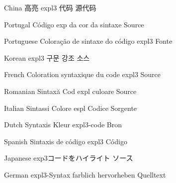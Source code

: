 China
高亮 expl3 代码
源代码

Portugal
Código exp da cor da sintaxe
Source

Portuguese
Coloração de sintaxe do código expl3
Fonte


Korean
expl3 구문 강조
소스

French
Coloration syntaxique du code expl3
Source

Romanian
Sintaxă Cod expl culoare
Source

Italian
Sintassi Colore espl Codice
Sorgente

Dutch
Syntaxis Kleur expl3-code
Bron


Spanish
Sintaxis de código expl3
Código

Japanese
exp3コードをハイライト
ソース

German
expl3-Syntax farblich hervorheben
Quelltext

